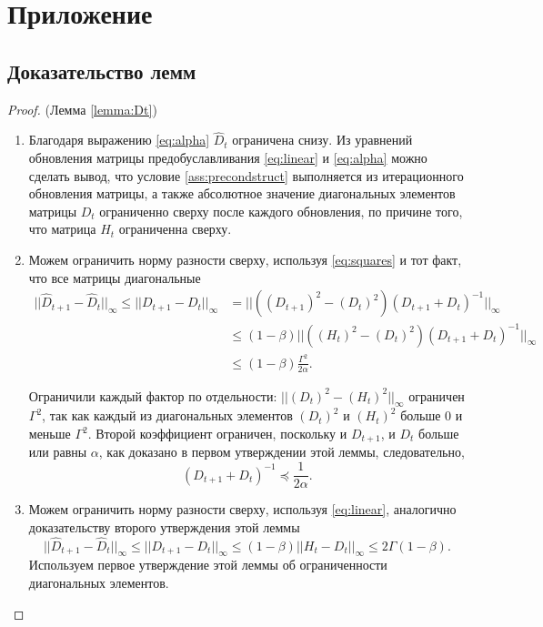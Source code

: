 \appendix
\section{Приложение}
\subsection{Доказательство лемм}
\label{appendix:lemmas}

\begin{proof} (Лемма \ref{lemma:Dt})
\begin{enumerate}
    \item Благодаря выражению \eqref{eq:alpha} $\hat{D}_t$ ограничена снизу. Из уравнений обновления матрицы предобуславливания \eqref{eq:linear} и \eqref{eq:alpha} можно сделать вывод, что условие \ref{ass:precondstruct} выполняется из итерационного обновления матрицы, а также абсолютное значение диагональных элементов матрицы $D_t$ ограниченно сверху после каждого обновления, по причине того, что матрица $H_t$ ограниченна сверху.

    \item Можем ограничить норму разности сверху, используя \eqref{eq:squares} и тот факт, что все матрицы диагональные
    \begin{equation*}
    \begin{aligned}
    || \hat{D}_{t+1} - \hat{D}_t||_\infty \le || D_{t+1} - D_t||_\infty &=  || ((D_{t+1})^2 - (D_t)^2)(D_{t+1} + D_t)^{-1} ||_\infty \\
    &\le (1 - \beta)|| ((H_t)^2 - (D_t)^2)(D_{t+1} + D_t)^{-1} ||_\infty \\
    &\le (1 - \beta)\frac{\Gamma^2}{2\alpha}.
    \end{aligned}
    \end{equation*}

    Ограничили каждый фактор по отдельности: $||(D_t)^2 - (H_t)^2||_\infty$ ограничен $\Gamma^2$, так как каждый из диагональных элементов $(D_t)^2$ и $(H_t)^2$ больше 0 и меньше $\Gamma^2$.
    Второй коэффициент ограничен, поскольку и $D_{t+1}$, и $D_t$ больше или равны $\alpha$, как доказано в первом утверждении этой леммы, следовательно, $$(D_{t+1} + D_t)^{-1} \preccurlyeq \frac{1}{2\alpha}.$$

    \item Можем ограничить норму разности сверху, используя \eqref{eq:linear}, аналогично доказательству второго утверждения этой леммы
    \begin{equation*}
    || \hat{D}_{t+1} - \hat{D}_t||_\infty \le || D_{t+1} - D_t||_\infty \le (1 - \beta)|| H_t - D_t ||_\infty \le 2\Gamma (1 - \beta).
    \end{equation*}
    Используем первое утверждение этой леммы об ограниченности диагональных элементов.
\end{enumerate}
\end{proof}

